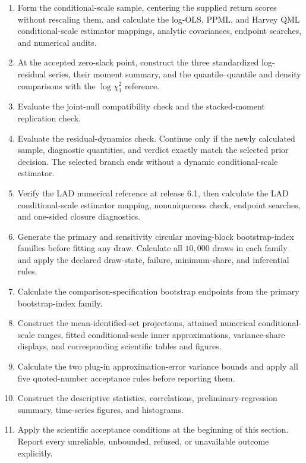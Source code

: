 \documentclass[11pt]{article}
\begin{document}
\begin{enumerate}
variance-share ranges. Evaluate the mean-equation identification diagnostics and the reported-versus-comparison
specification check.
\item Form the conditional-scale sample, centering the supplied return scores without rescaling them, and
calculate the log-OLS, PPML, and Harvey QML conditional-scale estimator
mappings, analytic covariances, endpoint searches, and numerical audits.
\item At the accepted zero-slack point, construct the three standardized log-residual
series, their moment summary, and the quantile--quantile and density comparisons
with the \(\log\chi_1^2\) reference.
\item Evaluate the joint-null compatibility check and the stacked-moment replication check.
\item Evaluate the residual-dynamics check. Continue only if the newly calculated sample,
diagnostic quantities, and verdict exactly match the selected prior decision. The selected branch
ends without a dynamic conditional-scale estimator.
\item Verify the LAD numerical reference at release 6.1, then calculate the LAD
conditional-scale estimator mapping, nonuniqueness check, endpoint searches, and one-sided closure diagnostics.
\item Generate the primary and sensitivity circular moving-block bootstrap-index families before fitting any
draw. Calculate all \(10{,}000\) draws in each family and apply the declared draw-state, failure,
minimum-share, and inferential rules.
\item Calculate the comparison-specification bootstrap endpoints from the primary bootstrap-index family.
\item Construct the mean-identified-set projections, attained numerical conditional-scale ranges, fitted
conditional-scale inner approximations, variance-share displays, and corresponding scientific
tables and figures.
\item Calculate the two plug-in approximation-error variance bounds and apply all five
quoted-number acceptance rules before reporting them.
\item Construct the descriptive statistics, correlations, preliminary-regression summary, time-series
figures, and histograms.
\item Apply the scientific acceptance conditions at the beginning of this section. Report every
unreliable, unbounded, refused, or unavailable outcome explicitly.
\end{enumerate}
\end{document}
